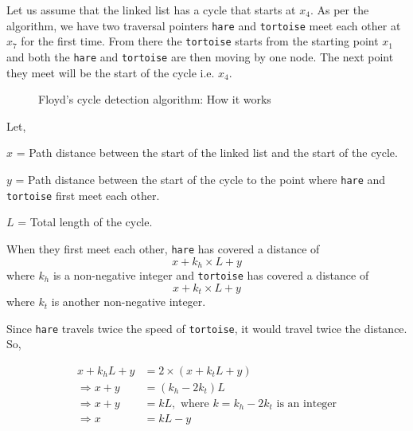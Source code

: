 \documentclass[a4paper,11pt]{book}
\begin{document}
Let us assume that the linked list has a cycle that starts at $x_4$. As per the algorithm, we have two traversal pointers \lstinline{hare} and \lstinline{tortoise} meet each other at $x_7$ for the first time. From there the \lstinline{tortoise} starts from the starting point $x_1$ and both the \lstinline{hare} and \lstinline{tortoise} are then moving by one node. The next point they meet will be the start of the cycle i.e. $x_4$.
\vspace{5mm}

\begin{figure}
\begin{center}
\end{center}
\caption{Floyd's cycle detection algorithm: How it works}
\end{figure}

\noindent Let,

 $x$ = Path distance between the start of the linked list and the start of the cycle.

 $y$ = Path distance between the start of the cycle to the point where \lstinline{hare} and \lstinline{tortoise} first meet each other.

 $L$ = Total length of the cycle.

\noindent When they first meet each other, \lstinline{hare} has covered a distance of $$x + k_h\times L + y$$ where $k_h$ is a non-negative integer and \lstinline{tortoise} has covered a distance of $$x + k_t\times L + y$$ where $k_t$ is another non-negative integer.

\noindent Since \lstinline{hare} travels twice the speed of \lstinline{tortoise}, it would travel twice the distance. So,

\begin{align*}
x + k_h L + y &= 2\times (x + k_t L + y)\\
\Rightarrow x + y &= (k_h - 2k_t) L\\
\Rightarrow x + y &= k L, \text{ where } k = k_h - 2k_t \text{ is an integer}\\
\Rightarrow x &= k L - y\\
\end{align*}
\end{document}
